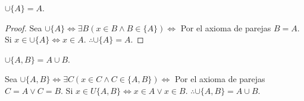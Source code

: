 





	
	
\begin{problema}
	$\cup \{A\}=A$.
\end{problema}
	
\begin{proof}
	Sea $ \cup \{A\}\iff \exists B(x\in B \wedge B\in \{A\})\iff$ Por el axioma de parejas $B=A$. Si $x\in \cup \{A\} \iff x\in  A$. $\therefore \cup \{A\}=A$.
\end{proof}
	
\begin{problema}
	$\cup \{A,B\}=A\cup B$.
\end{problema}
\begin{sol}
	Sea $\cup \{A,B\}\iff \exists C(x\in C \wedge C\in \{A,B\})\iff $ Por el axioma de parejas $C=A \vee C= B$. Si $x\in U\{A,B\}\iff x\in A\vee x\in B$. $\therefore \cup \{A,B\}=A\cup B$. 
\end{sol}



